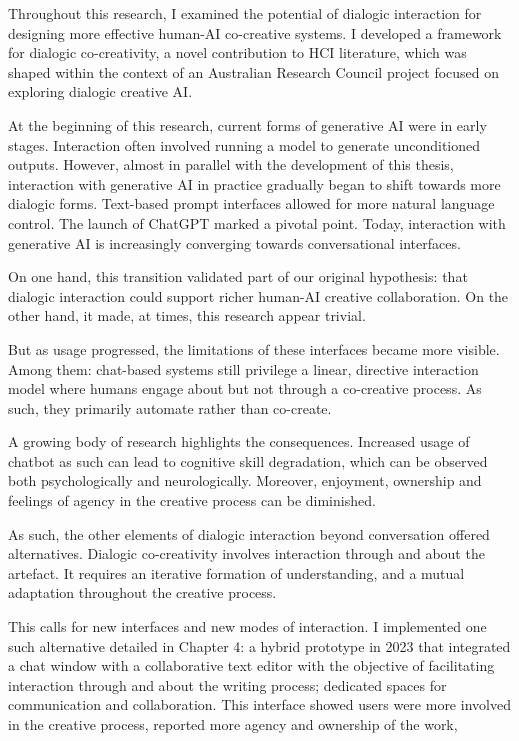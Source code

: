 Throughout this research, I examined the potential of dialogic interaction for designing more effective human-AI co-creative systems. I developed a framework for dialogic co-creativity, a novel contribution to HCI literature, which was shaped within the context of an Australian Research Council project focused on exploring dialogic creative AI.

At the beginning of this research, current forms of generative AI were in early stages. Interaction often involved running a model to generate unconditioned outputs. However, almost in parallel with the development of this thesis, interaction with generative AI in practice gradually began to shift towards more dialogic forms. Text-based prompt interfaces allowed for more natural language control. The launch of ChatGPT marked a pivotal point. Today, interaction with generative AI is increasingly converging towards conversational interfaces. 

On one hand, this transition validated part of our original hypothesis: that dialogic interaction could support richer human-AI creative collaboration. On the other hand, it made, at times, this research appear trivial. 

But as usage progressed, the limitations of these interfaces became more visible. Among them: chat-based systems still privilege a linear, directive interaction model where humans engage about but not through a co-creative process. As such, they primarily automate rather than co-create. 

A growing body of research highlights the consequences. Increased usage of chatbot as such can lead to cognitive skill degradation, which can be observed both psychologically and neurologically. Moreover, enjoyment, ownership and feelings of agency in the creative process can be diminished. 

As such, the other elements of dialogic interaction beyond conversation offered alternatives. Dialogic co-creativity involves interaction through and about the artefact. It requires an iterative formation of understanding, and a mutual adaptation throughout the creative process.

This calls for new interfaces and new modes of interaction. I implemented one such alternative detailed in Chapter 4: a hybrid prototype in 2023 that integrated a chat window with a collaborative text editor with the objective of facilitating interaction through and about the writing process; dedicated spaces for communication and collaboration.  This interface showed users were more involved in the creative process, reported more agency and ownership of the work, 

